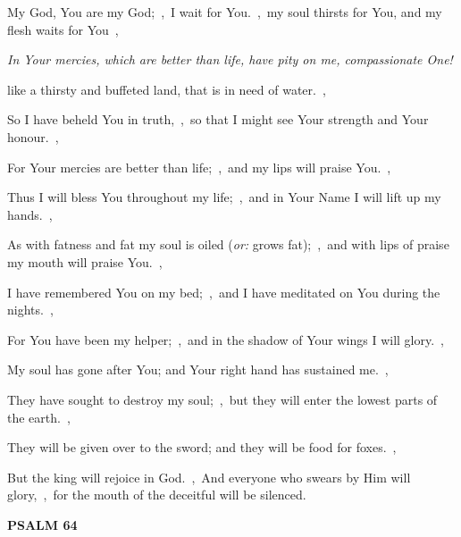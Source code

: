 \documentclass[12pt,twoside,a5paper]{article}
\newcommand{\psalm}[1]{\textbf{PSALM {#1}}\nopagebreak}
\newcommand{\qanona}[1]{{\liturgicalhint{Qanona.} \emph{#1}}}
\newcommand{\translationoption}[1]{\emph{or:} #1}
\begin{document}
\begin{normalparskip}
  My God, You are my God;~\sep\ I wait for You.~\sep\ my soul thirsts for You, and my flesh waits for You~\sep

  \qanona{In Your mercies, which are better than life, have pity on me, compassionate One!}

  like a thirsty and buffeted land, that is in need of water.~\sep

  So I have beheld You in truth,~\sep\ so that I might see Your strength and Your honour.~\sep

  For Your mercies are better than life;~\sep\ and my lips will praise You.~\sep

  Thus I will bless You throughout my life;~\sep\ and in Your Name I will lift up my hands.~\sep

  As with fatness and fat my soul is oiled (\translationoption{grows fat});~\sep\ and with lips of praise my mouth will praise You.~\sep

  I have remembered You on my bed;~\sep\ and I have meditated on You during the nights.~\sep

  For You have been my helper;~\sep\ and in the shadow of Your wings I will glory.~\sep

  My soul has gone after You; and Your right hand has sustained me.~\sep

  They have sought to destroy my soul;~\sep\ but they will enter the lowest parts of the earth.~\sep

  They will be given over to the sword; and they will be food for foxes.~\sep

  But the king will rejoice in God.~\sep\ And everyone who swears by Him will glory,~\sep\ for the mouth of the deceitful will be silenced.
\end{normalparskip}

\psalm{64}
\end{document}
